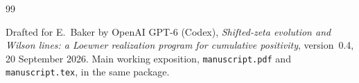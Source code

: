 \begin{thebibliography}{99}
\raggedright
{}
Drafted for E.~Baker by OpenAI GPT-6 (Codex),
\emph{Shifted-zeta evolution and Wilson lines: a Loewner realization
program for cumulative positivity}, version~0.4, 20 September 2026.
Main working exposition, \nolinkurl{manuscript.pdf}
and \nolinkurl{manuscript.tex}, in the same package.

\end{thebibliography}
